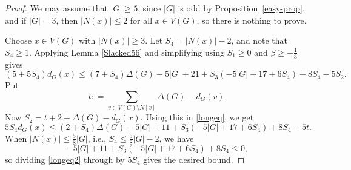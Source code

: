 \documentclass[12pt]{article}
\theoremstyle{plain}
\theoremstyle{definition}
\theoremstyle{remark}
\newcommand{\card}[1]{\left|#1\right|}
\newcommand{\DefinedAs}{\mathrel{\mathop:}=}
\begin{document}
\begin{proof}
We may assume that $\card{G}\ge 5$, since $\card{G}$ is odd by
Proposition~\ref{easy-prop}, and if $\card{G}=3$, then $\card{N(x)}\le 2$ for
all $x\in V(G)$, so there is nothing to prove.

Choose $x\in V(G)$ with $\card{N(x)}\ge 3$.
Let $S_4=\card{N(x)}-2$, and note that $S_4\ge 1$.
Applying Lemma \ref{Slacked56} and simplifying using $S_1 \ge 0$ and $\beta \ge -\frac13$ gives
\begin{equation}\label{longeq}
(5+5S_4)d_G(x) \le (7 + S_4)\Delta(G) - 5\card{G} + 21 + S_3(-5\card{G} + 17 + 6S_4) + 8S_4 - 5S_2.
\end{equation}
Put 
\[t \DefinedAs \sum_{v \in V(G) \setminus N[x]} \Delta(G) - d_G(v).\]
Now $S_2 = t + 2 + \Delta(G) - d_G(x)$.  Using this in \eqref{longeq}, we get
\begin{equation}\label{longeq2}
5S_4d_G(x) \le (2 + S_4)\Delta(G) - 5\card{G} + 11 + S_3(-5\card{G} + 17 + 6S_4) + 8S_4 - 5t.
\end{equation}
When $\card{N(x)}\le\frac58\card{G}$, i.e.,
$S_4 \le \frac58\card{G} - 2$, we have
\[- 5\card{G} + 11 + S_3(-5\card{G} + 17 + 6S_4) + 8S_4 \le 0,\]
so dividing \eqref{longeq2} through by $5S_4$ gives the desired bound.


\end{proof}
\end{document}

